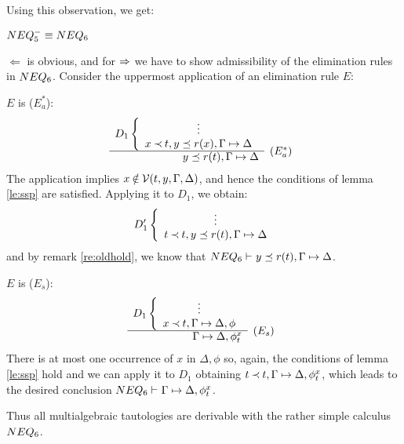 \noindent
Using this observation, we get:
%
\begin{LEMMA}\label{le:spneqiselneq}
 $NEQ_5^- \equiv NEQ_6$
\end{LEMMA}
\begin{PROOF}
 $\Leftarrow$ is obvious, and for $\mathrel\Rightarrow$ we have to show admissibility of
 the elimination rules in $NEQ_6$. Consider the uppermost application of an
 elimination rule $E$:
\begin{LS}
\item $E$ is ($E_a^*$):
 \[ \begin{array}{rl}
D_1 \left \{ \begin{array}{c}
\vdots \\
 x\Incl t, y\preceq r(x),\GSD \end{array} \right . \\ \cline{1-1}
 y\preceq r(t), \GSD & \rabove{(E_a^*)} \end{array} \]
The application implies $x\not\in\Vars(t,y,\Gamma,\Delta)$, and hence the
conditions of lemma \ref{le:ssp} are satisfied. Applying it to $D_1$, we
obtain:
\[ D_1' \left \{ \begin{array}{c}
 \vdots \\
 t\mathbin{\prec} t, y\preceq r(t),\Gamma\mathrel{\mapsto}\Delta \end{array} \right . \]
and by remark \ref{re:oldhold}, we know that ${NEQ_6}\vdash^{{}}y\preceq
r(t),\Gamma\mathrel{\mapsto}\Delta$.
\item $E$ is ($E_s$):
 \[ \begin{array}{rl}
      D_1 \left \{ \begin{array}{c}
         \vdots \\
        x\Incl t,\GSD, \phi \end{array} \right . \\ \cline{1-1}
     \GSD, \phi_t^x & \rabove{(E_s)} \end{array} \]
There is at most one occurrence of $x$ in $\Delta,\phi$ so, again, the
conditions of lemma \ref{le:ssp} hold and we can apply it to $D_1$ obtaining
 $t\mathbin{\prec} t,\Gamma\mathrel{\mapsto}\Delta, \phi_t^x$, which leads to the desired conclusion 
 ${NEQ_6}\vdash^{{}}\Gamma\mathrel{\mapsto}\Delta,\phi_t^x$.
\end{LS}
\end{PROOF}
\noindent
Thus all multialgebraic tautologies are derivable with the
rather simple calculus $NEQ_6$.

